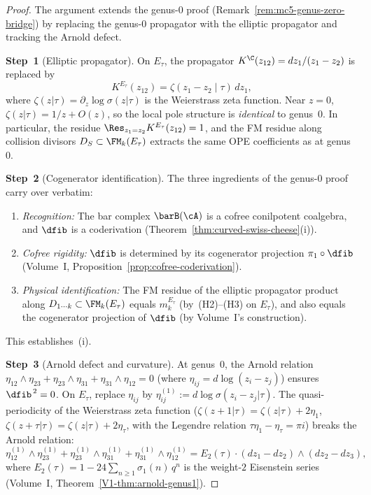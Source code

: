 \begin{proof}
The argument extends the genus-$0$ proof
(Remark~\ref{rem:mc5-genus-zero-bridge}) by replacing the
genus-$0$ propagator with the elliptic propagator and tracking the
Arnold defect.

\textbf{Step~1} (Elliptic propagator).
On $E_\tau$, the propagator $K^{\C}(z_{12}) = dz_1/(z_1 - z_2)$ is
replaced by
\[
K^{E_\tau}(z_{12})
= \zeta(z_1 - z_2 \mid \tau)\,dz_1,
\]
where $\zeta(z|\tau) = \partial_z \log\sigma(z|\tau)$ is the
Weierstrass zeta function. Near $z = 0$,
$\zeta(z|\tau) = 1/z + O(z)$, so the local pole structure is
\emph{identical} to genus~$0$. In particular, the residue
$\Res_{z_1 = z_2} K^{E_\tau}(z_{12}) = 1$, and the FM residue
along collision divisors $D_S \subset \FM_k(E_\tau)$ extracts the
same OPE coefficients as at genus~$0$.

\textbf{Step~2} (Cogenerator identification).
The three ingredients of the genus-$0$ proof carry over verbatim:
\begin{enumerate}[label=(\alph*)]
\item \emph{Recognition:} The bar complex $\barB(\cA)$ is a cofree
 conilpotent coalgebra, and $\dfib$ is a coderivation
 (Theorem~\ref{thm:curved-swiss-cheese}(i)).
\item \emph{Cofree rigidity:} $\dfib$ is determined by its
 cogenerator projection $\pi_1 \circ \dfib$
 (Volume~I, Proposition~\ref*{prop:cofree-coderivation}).
\item \emph{Physical identification:} The FM residue of the
 elliptic propagator product along
 $D_{1\cdots k} \subset \FM_k(E_\tau)$ equals $m_k^{E_\tau}$
 (by~(H2)--(H3) on $E_\tau$), and also equals the cogenerator
 projection of $\dfib$ (by Volume~I's construction).
\end{enumerate}
This establishes~(i).

\textbf{Step~3} (Arnold defect and curvature).
At genus~$0$, the Arnold relation
$\eta_{12} \wedge \eta_{23} + \eta_{23} \wedge \eta_{31}
+ \eta_{31} \wedge \eta_{12} = 0$ (where
$\eta_{ij} = d\log(z_i - z_j)$) ensures $\dfib^{\,2} = 0$.
On $E_\tau$, replace $\eta_{ij}$ by
$\eta_{ij}^{(1)} := d\log\sigma(z_i - z_j|\tau)$. The
quasi-periodicity of the Weierstrass zeta function
($\zeta(z + 1|\tau) = \zeta(z|\tau) + 2\eta_1$,
$\zeta(z + \tau|\tau) = \zeta(z|\tau) + 2\eta_\tau$,
with the Legendre relation
$\tau\eta_1 - \eta_\tau = \pi i$) breaks the Arnold relation:
\[
\eta_{12}^{(1)} \wedge \eta_{23}^{(1)}
+ \eta_{23}^{(1)} \wedge \eta_{31}^{(1)}
+ \eta_{31}^{(1)} \wedge \eta_{12}^{(1)}
= E_2(\tau) \cdot (dz_1 - dz_2) \wedge (dz_2 - dz_3),
\]
where $E_2(\tau) = 1 - 24\sum_{n \geq 1} \sigma_1(n)\,q^n$ is the
weight-$2$ Eisenstein series
(Volume~I, Theorem~\ref*{V1-thm:arnold-genus1}).


\end{proof}
